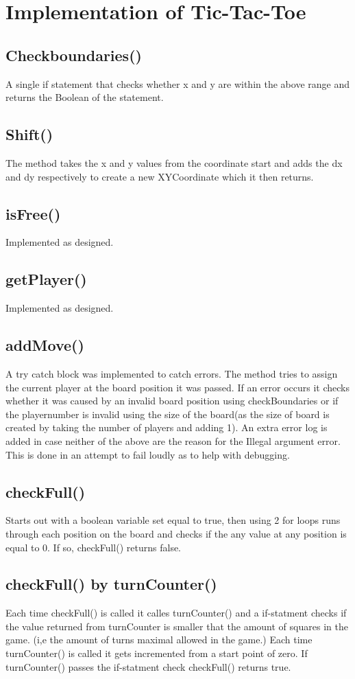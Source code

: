\documentclass[a4paper,10pt]{article}
\begin{document}
		\section{Implementation  of Tic-Tac-Toe}  
	\subsection{Checkboundaries()}
	A single if statement that checks whether x and y are within the above range and returns the Boolean of the statement.
	\subsection{Shift()}
	The method takes the x and y values from the coordinate start and adds the dx and dy respectively to create a new XYCoordinate which it then returns.
	\subsection{isFree()}
	Implemented as designed.
	\subsection{getPlayer()}
	Implemented as designed.
	\subsection{addMove()}
	A try catch block was implemented to catch errors. The method tries to assign the current player at the board position it was passed. If an error occurs it checks whether it was caused by an invalid board position using checkBoundaries or if the playernumber is invalid using the size of the board(as the size of board is created by taking the number of players and adding 1). An extra error log is added in case neither of the above are the reason for the Illegal argument error. This is done in an attempt to fail loudly as to help with debugging.
	\subsection{checkFull()}
	Starts out with a boolean variable set equal to true, then using 2 for loops runs through each position on the board and checks if the any value at any position is equal to 0. If so, checkFull() returns false.
	
\subsection{checkFull() by turnCounter()}
Each time checkFull() is called it calles turnCounter() and a if-statment checks if the value returned from turnCounter is smaller that the amount of squares in the game. (i,e the amount of turns maximal allowed in the game.) Each time turnCounter() is called it gets incremented from a start point of zero. If turnCounter() passes the if-statment check checkFull() returns true. 
\end{document}
